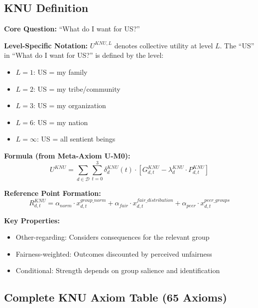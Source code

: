 \subsection{KNU Definition}

\begin{tcolorbox}[colback=green!5!white, colframe=green!75!black, 
    title=Collective Utility (KNU)]

\textbf{Core Question:} ``What do I want for US?''

\textbf{Level-Specific Notation:} $U^{KNU,L}$ denotes collective utility at level $L$.
The ``US'' in ``What do I want for US?'' is defined by the level:
\begin{itemize}[nosep]
\item $L = 1$: US = my family
\item $L = 2$: US = my tribe/community
\item $L = 3$: US = my organization
\item $L = 6$: US = my nation
\item $L = \infty$: US = all sentient beings
\end{itemize}

\textbf{Formula (from Meta-Axiom U-M0):}
\begin{equation}
U^{KNU} = \sum_{d \in \mathcal{D}} \sum_{t=0}^{3} \delta^{KNU}_{d}(t) \cdot 
\left[ G^{KNU}_{d,t} - \lambda^{KNU}_{d} \cdot P^{KNU}_{d,t} \right]
\end{equation}

\textbf{Reference Point Formation:}
\begin{equation}
R^{KNU}_{d,t} = \alpha_{norm} \cdot x^{group\_norm}_{d,t} + 
               \alpha_{fair} \cdot x^{fair\_distribution}_{d,t} + 
               \alpha_{peer} \cdot x^{peer\_groups}_{d,t}
\end{equation}

\textbf{Key Properties:}
\begin{itemize}
\item Other-regarding: Considers consequences for the relevant group
\item Fairness-weighted: Outcomes discounted by perceived unfairness
\item Conditional: Strength depends on group salience and identification
\end{itemize}

\end{tcolorbox}

\subsection{Complete KNU Axiom Table (65 Axioms)}

